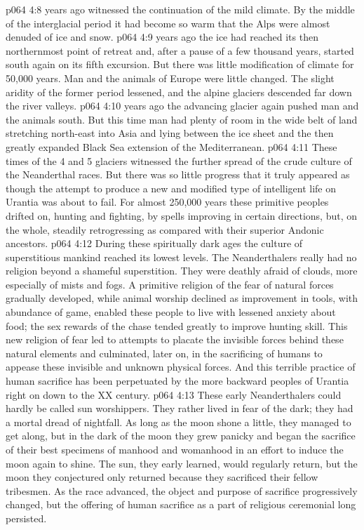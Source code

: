 \vs p064 4:8 \pc {} years ago witnessed the continuation of the mild climate. By the middle of the interglacial period it had become so warm that the Alps were almost denuded of ice and snow.
\vs p064 4:9 \pc {} years ago the ice had reached its then northernmost point of retreat and, after a pause of a few thousand years, started south again on its fifth excursion. But there was little modification of climate for 50,000 years. Man and the animals of Europe were little changed. The slight aridity of the former period lessened, and the alpine glaciers descended far down the river valleys.
\vs p064 4:10 \pc {} years ago the advancing glacier again pushed man and the animals south. But this time man had plenty of room in the wide belt of land stretching north\hyp{}east into Asia and lying between the ice sheet and the then greatly expanded Black Sea extension of the Mediterranean.
\vs p064 4:11 These times of the 4 and 5 glaciers witnessed the further spread of the crude culture of the Neanderthal races. But there was so little progress that it truly appeared as though the attempt to produce a new and modified type of intelligent life on Urantia was about to fail. For almost 250,000 years these primitive peoples drifted on, hunting and fighting, by spells improving in certain directions, but, on the whole, steadily retrogressing as compared with their superior Andonic ancestors.
\vs p064 4:12 \pc During these spiritually dark ages the culture of superstitious mankind reached its lowest levels. The Neanderthalers really had no religion beyond a shameful superstition. They were deathly afraid of clouds, more especially of mists and fogs. A primitive religion of the fear of natural forces gradually developed, while animal worship declined as improvement in tools, with abundance of game, enabled these people to live with lessened anxiety about food; the sex rewards of the chase tended greatly to improve hunting skill. This new religion of fear led to attempts to placate the invisible forces behind these natural elements and culminated, later on, in the sacrificing of humans to appease these invisible and unknown physical forces. And this terrible practice of human sacrifice has been perpetuated by the more backward peoples of Urantia right on down to the XX century.
\vs p064 4:13 These early Neanderthalers could hardly be called sun worshippers. They rather lived in fear of the dark; they had a mortal dread of nightfall. As long as the moon shone a little, they managed to get along, but in the dark of the moon they grew panicky and began the sacrifice of their best specimens of manhood and womanhood in an effort to induce the moon again to shine. The sun, they early learned, would regularly return, but the moon they conjectured only returned because they sacrificed their fellow tribesmen. As the race advanced, the object and purpose of sacrifice progressively changed, but the offering of human sacrifice as a part of religious ceremonial long persisted.
